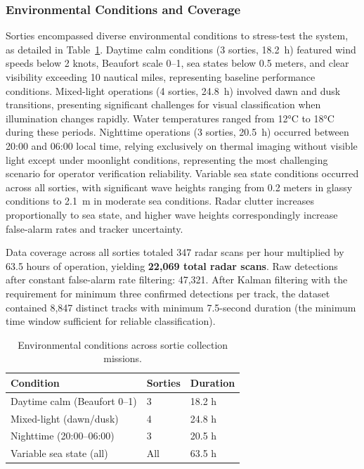 \documentclass[conf]{asmeconf}
\begin{document}
\subsubsection{Environmental Conditions and Coverage}

Sorties encompassed diverse environmental conditions to stress-test the system, as detailed in Table~\ref{tab:environmental_conditions}. Daytime calm conditions (3 sorties, \SI{18.2}{h}) featured wind speeds below 2 knots, Beaufort scale 0--1, sea states below 0.5 meters, and clear visibility exceeding 10 nautical miles, representing baseline performance conditions. Mixed-light operations (4 sorties, \SI{24.8}{h}) involved dawn and dusk transitions, presenting significant challenges for visual classification when illumination changes rapidly. Water temperatures ranged from 12°C to 18°C during these periods. Nighttime operations (3 sorties, \SI{20.5}{h}) occurred between 20:00 and 06:00 local time, relying exclusively on thermal imaging without visible light except under moonlight conditions, representing the most challenging scenario for operator verification reliability. Variable sea state conditions occurred across all sorties, with significant wave heights ranging from 0.2 meters in glassy conditions to \SI{2.1}{m} in moderate sea conditions. Radar clutter increases proportionally to sea state, and higher wave heights correspondingly increase false-alarm rates and tracker uncertainty.

Data coverage across all sorties totaled 347 radar scans per hour multiplied by 63.5 hours of operation, yielding \textbf{22,069 total radar scans}. Raw detections after constant false-alarm rate filtering: 47,321. After Kalman filtering with the requirement for minimum three confirmed detections per track, the dataset contained 8,847 distinct tracks with minimum 7.5-second duration (the minimum time window sufficient for reliable classification).

\begin{table}[t]
\caption{Environmental conditions across sortie collection missions.}
\label{tab:environmental_conditions}
\centering
\small
\begin{tabular}{@{}lll@{}}
\toprule
Condition & Sorties & Duration \\
\midrule
Daytime calm (Beaufort 0--1) & 3 & 18.2 h \\
Mixed-light (dawn/dusk) & 4 & 24.8 h \\
Nighttime (20:00--06:00) & 3 & 20.5 h \\
Variable sea state (all) & All & 63.5 h \\
\bottomrule
\end{tabular}
\end{table}
\end{document}
